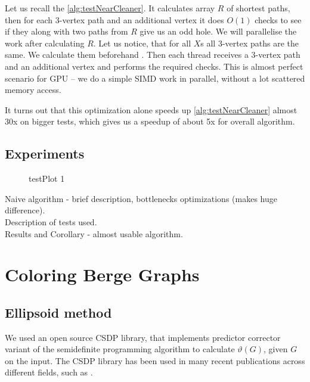 Let us recall the \cref{alg:testNearCleaner}. It calculates array $R$ of shortest paths, then for each 3-vertex path and an additional vertex it does $O(1)$ checks to see if they along with two paths from $R$ give us an odd hole. We will parallelise the work after calculating $R$. Let us notice, that for all $X$s all 3-vertex paths are the same. We calculate them beforehand  . Then each thread receives a 3-vertex path and an additional vertex and performs the required checks. This is almost perfect scenario for GPU -- we do a simple SIMD work in parallel, without a lot scattered memory access.

It turns out that this optimization alone speeds up \cref{alg:testNearCleaner} almost 30x  on bigger tests, which gives us a speedup of about 5x  for overall algorithm.


\subsection{Experiments}

\begin{figure}
  \centering
  
  \caption{testPlot 1}
\end{figure}

Naive algorithm - brief description, bottlenecks optimizations (makes huge difference).\\

Description of tests used.\\

Results and Corollary - almost usable algorithm.


\section{Coloring Berge Graphs}

\subsection{Ellipsoid method}

We used an open source CSDP \cite{csdpRepo, csdp1999} library, that implements predictor corrector variant of the semidefinite programming algorithm to calculate $\vartheta(G)$, given $G$ on the input. The CSDP library has been used in many recent publications across different fields, such as \cite{Ampountolas_2017, Adasme_2011}.

